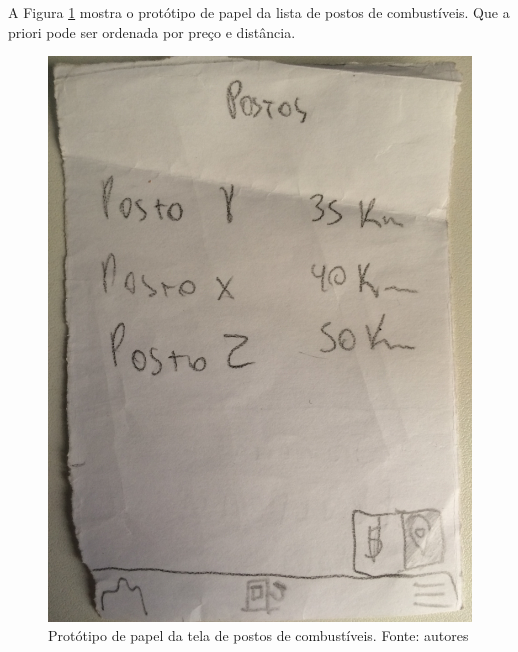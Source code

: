 A Figura \ref{img:prototipo_de_papel_lista_postos} mostra o protótipo de papel da lista de postos de combustíveis. Que a priori pode ser ordenada por preço e distância.
\begin{figure}[H]
    \centering
    \includegraphics[scale=0.1, angle=-90]{figuras/prototipo_papel_lista_de_postos.jpg}
    \caption[Protótipo de papel da tela de postos de combustíveis]{Protótipo de papel da tela de postos de combustíveis. Fonte: autores}
    \label{img:prototipo_de_papel_lista_postos}
\end{figure}
 \pagebreak

